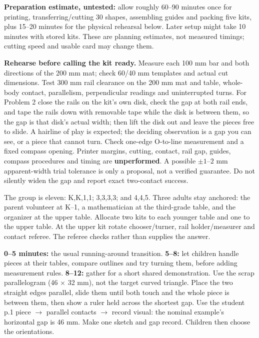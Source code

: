 \documentclass[11pt,letterpaper]{article}
\newcommand{\heading}[1]{\par\vspace{2pt}{\large\bfseries #1}\par}
\newcommand{\lead}[1]{\textbf{#1}}
\begin{document}
\lead{Preparation estimate, untested:} allow roughly 60--90 minutes once for printing, transferring/cutting 30 shapes, assembling guides and packing five kits, plus 15--20 minutes for the physical rehearsal below. Later setup might take 10 minutes with stored kits. These are planning estimates, not measured timings; cutting speed and usable card may change them.

\lead{Rehearse before calling the kit ready.} Measure each 100 mm bar and both directions of the 200 mm mat; check 60/40 mm templates and actual cut dimensions. Test 300 mm rail clearance on the 200 mm mat and table, whole-body contact, parallelism, perpendicular readings and uninterrupted turns. For Problem 2 close the rails on the kit's own disk, check the gap at both rail ends, and tape the rails down with removable tape while the disk is between them, so the gap is that disk's actual width; then lift the disk out and leave the pieces free to slide. A hairline of play is expected; the deciding observation is a gap you can see, or a piece that cannot turn. Check one-edge O-to-line measurement and a fixed compass opening. Printer margins, cutting, contact, rail gap, guides, compass procedures and timing are \textbf{unperformed}. A possible $\pm1$--$2$ mm apparent-width trial tolerance is only a proposal, not a verified guarantee. Do not silently widen the gap and report exact two-contact success.

\newpage
\heading{A concrete first hour at three fixed tables}
The group is eleven: K,K,1,1; 3,3,3,3; and 4,4,5. Three adults stay anchored: the parent volunteer at K--1, a mathematician at the third-grade table, and the organizer at the upper table. Allocate two kits to each younger table and one to the upper table. At the upper kit rotate chooser/turner, rail holder/measurer and contact referee. The referee checks rather than supplies the answer.

\lead{0--5 minutes:} the usual running-around transition. \lead{5--8:} let children handle pieces at their tables, compare outlines and try turning them, before adding measurement rules. \lead{8--12:} gather for a short shared demonstration. Use the scrap parallelogram (46 $\times$ 32 mm), not the target curved triangle. Place the two straight edges parallel, slide them until both touch and the whole piece is between them, then show a ruler held across the shortest gap. Use the student p.1 piece $\to$ parallel contacts $\to$ record visual: the nominal example's horizontal gap is 46 mm. Make one sketch and gap record. Children then choose the orientations.
\end{document}
